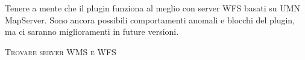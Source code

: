 Tenere a mente che il plugin funziona al meglio con server WFS basati su UMN
MapServer. Sono ancora possibili comportamenti anomali e blocchi del plugin,
ma ci saranno miglioramenti in future versioni.

\begin{Tip}[ht]\caption{\textsc{Trovare server WMS e WFS}}
\end{Tip} 

